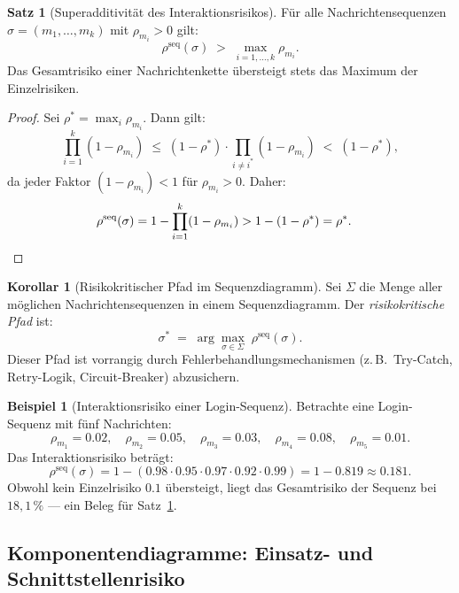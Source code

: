 ﻿\documentclass[a4paper,12pt]{article}
\theoremstyle{definition}
\newtheorem{beispiel}{Beispiel}
\newtheorem{satz}{Satz}
\newtheorem{korollar}{Korollar}
\newenvironment{beweis}{\begin{proof}}{\end{proof}}
\begin{document}
\begin{satz}[Superadditivit\"at des Interaktionsrisikos]
\label{satz:seq-superadditiv}
    F\"ur alle Nachrichtensequenzen $\sigma = (m_1, \ldots, m_k)$ mit
    $\rho_{m_i} > 0$ gilt:
    \[
        \rho^{\mathrm{seq}}(\sigma) \;>\; \max_{i=1,\ldots,k} \rho_{m_i}.
    \]
    Das Gesamtrisiko einer Nachrichtenkette \"ubersteigt stets das Maximum der
    Einzelrisiken.
\end{satz}

\begin{beweis}
    Sei $\rho^* = \max_i \rho_{m_i}$. Dann gilt:
    \[
        \prod_{i=1}^k (1 - \rho_{m_i}) \;\leq\; (1 - \rho^*) \cdot
        \prod_{i \neq i^*} (1 - \rho_{m_i}) \;<\; (1 - \rho^*),
    \]
    da jeder Faktor $(1 - \rho_{m_i}) < 1$ f\"ur $\rho_{m_i} > 0$. Daher:
    \[
        \rho^{\mathrm{seq}}(\sigma) = 1 - \prod_{i=1}^k(1-\rho_{m_i})
        > 1 - (1-\rho^*) = \rho^*.
        \quad\qedhere
    \]
\end{beweis}

\begin{korollar}[Risikokritischer Pfad im Sequenzdiagramm]
\label{kor:kritpfad}
    Sei $\Sigma$ die Menge aller m\"oglichen Nachrichtensequenzen in einem
    Sequenzdiagramm. Der \emph{risikokritische Pfad} ist:
    \[
        \sigma^* \;=\; \arg\max_{\sigma \in \Sigma}\; \rho^{\mathrm{seq}}(\sigma).
    \]
    Dieser Pfad ist vorrangig durch Fehlerbehandlungsmechanismen (z.\,B.\ Try-Catch,
    Retry-Logik, Circuit-Breaker) abzusichern.
\end{korollar}

\begin{beispiel}[Interaktionsrisiko einer Login-Sequenz]
    Betrachte eine Login-Sequenz mit f\"unf Nachrichten:
    \[
        \rho_{m_1} = 0.02,\quad \rho_{m_2} = 0.05,\quad \rho_{m_3} = 0.03,
        \quad \rho_{m_4} = 0.08,\quad \rho_{m_5} = 0.01.
    \]
    Das Interaktionsrisiko betr\"agt:
    \[
        \rho^{\mathrm{seq}}(\sigma)
        = 1 - (0.98 \cdot 0.95 \cdot 0.97 \cdot 0.92 \cdot 0.99)
        = 1 - 0.819 \approx 0.181.
    \]
    Obwohl kein Einzelrisiko $0.1$ \"ubersteigt, liegt das Gesamtrisiko der
    Sequenz bei $18{,}1\,\%$ --- ein Beleg f\"ur Satz~\ref{satz:seq-superadditiv}.
\end{beispiel}

\subsection{Komponentendiagramme: Einsatz- und Schnittstellenrisiko}
\end{document}
